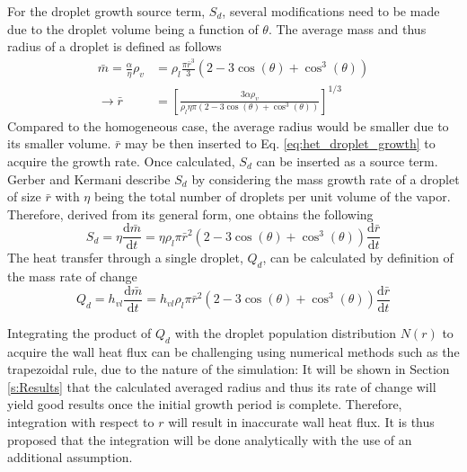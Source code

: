\documentclass[12pt]{article}
\numberwithin{equation}{section}
\begin{document}
For the droplet growth source term, $S_{d}$, several modifications need to be made due to the droplet volume being a function of $\theta$. The average mass and thus radius of a droplet is defined as follows
\begin{equation}
    \begin{aligned}
        \bar{m}=\frac{\alpha}{\eta}\rho_{v}&=\rho_{l}\frac{\pi \bar{r}^{3}}{3}(2-3\cos(\theta)+\cos^{3}(\theta))\\
        \rightarrow \bar{r}&=\left[\frac{3\alpha\rho_{v}}{\rho_{l}\eta\pi(2-3\cos(\theta)+\cos^{3}(\theta))} \right]^{1/3} 
    \end{aligned}
\end{equation}
Compared to the homogeneous case, the average radius would be smaller due to its smaller volume. $\bar{r}$ may be then inserted to Eq. \ref{eq:het_droplet_growth} to acquire the growth rate. Once calculated, $S_{d}$ can be inserted as a source term. Gerber and Kermani \cite{gerber2004pressure} describe $S_{d}$ by considering the mass growth rate of a droplet of size $\bar{r}$ with $\eta$ being the total number of droplets per unit volume of the vapor. Therefore, derived from its general form, one obtains the following
\begin{equation}
    S_{d}= \eta\frac{\mathrm{d}\bar{m}}{\mathrm{d}t}=\eta\rho_{l}\pi\bar{r}^{2}(2-3\cos(\theta)+\cos^{3}(\theta))\frac{\mathrm{d}\bar{r}}{\mathrm{d}t}
\end{equation}
The heat transfer through a single droplet, $Q_{d}$, can be calculated by definition of the mass rate of change
\begin{equation}
    Q_{d}=h_{vl}\frac{\mathrm{d}\bar{m}}{\mathrm{d}t}=h_{vl}\rho_{l}\pi\bar{r}^{2}(2-3\cos(\theta)+\cos^{3}(\theta))\frac{\mathrm{d}\bar{r}}{\mathrm{d}t}
\end{equation}

Integrating the product of $Q_{d}$ with the droplet population distribution $N(r)$ to acquire the wall heat flux can be challenging using numerical methods such as the trapezoidal rule, due to the nature of the simulation: It will be shown in Section \ref{s:Results} that the calculated averaged radius and thus its rate of change will yield good results once the initial growth period is complete. Therefore, integration with respect to $r$ will result in inaccurate wall heat flux. It is thus proposed that the integration will be done analytically with the use of an additional assumption.
\end{document}
